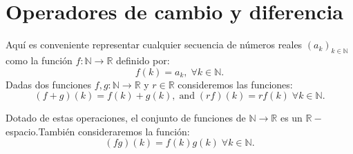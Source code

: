 \documentclass[a4,paper]{article}
\begin{document}
	\section{Operadores de cambio y diferencia}
	Aquí es conveniente representar cualquier secuencia de números reales $(a_{k}) _{k \in \mathbb{N}} $ como la función	$f: \mathbb{N} \to  \mathbb{R}$ definido por:
	$$
	f(k)=a_{k}, \; \forall k \in \mathbb{N}.
	$$
	Dadas dos funciones $ f,g: \mathbb{N} \to \mathbb{R} $ y $ r \in \mathbb{R} $ consideremos las funciones:
	$$
	(f+g)(k)=f(k)+g(k), \; \text{and} \; (rf)(k)=rf(k) \; \forall k \in \mathbb{N}.
	$$
	
	Dotado de estas operaciones, el conjunto de funciones de $ \mathbb{N} \to \mathbb{R} $ es un $ \mathbb{R}- $ espacio.También consideraremos la función:
	$$
	(fg)(k)=f(k)g(k) \; \forall k \in \mathbb{N}.
	$$
	
\end{document}
